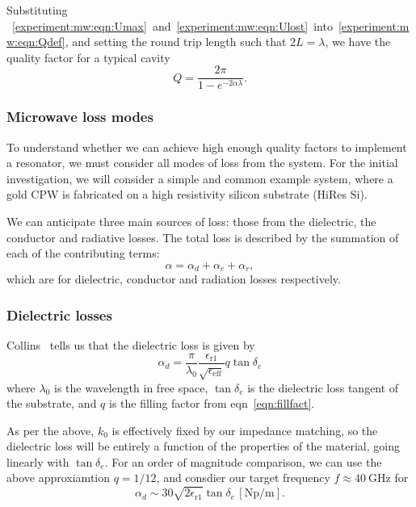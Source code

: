 Substituting
\myeqrefs~\ref{experiment:mw:eqn:Umax}~and~\ref{experiment:mw:eqn:Ulost}~into~\ref{experiment:mw:eqn:Qdef},
and setting the round trip length such that $2L=\lambda$, we have the quality
factor for a typical cavity
\begin{equation}
  Q = \frac{2\pi}{1 - e^{-2 \alpha \lambda}}.
\end{equation}

\subsubsection{Microwave loss modes}

To understand whether we can achieve high enough quality factors to implement a
resonator, we must consider all modes of loss from the system. For the initial
investigation, we will consider a simple and common example system, where a gold
CPW is fabricated on a high resistivity silicon substrate (HiRes Si). 

We can anticipate three main sources of loss: those from the dielectric, the
conductor and radiative losses. \cite{Simons2004} The total loss is described
by the summation of each of the contributing terms:
\begin{equation}
  \alpha = \alpha_d + \alpha_c + \alpha_r,
\end{equation}
which are for dielectric, conductor and radiation losses respectively.

\subsubsection*{Dielectric losses}

Collins~\cite{Collin2007} tells us that the dielectric loss is given by
\begin{equation}
  \alpha_d =
  \frac{\pi}{\lambda_0}\frac{\epsilon_\mathrm{r1}}{\sqrt{\epsilon_\mathrm{eff}}}
  q \tan \delta_e
\end{equation}
where $\lambda_0$ is the wavelength in free space, $\tan \delta_e$ is the
dielectric loss tangent of the substrate, and $q$ is the filling factor from
eqn~\ref{eqn:fillfact}.

As per the above, $k_0$ is effectively fixed by our impedance matching, so the
dielectric loss will be entirely a function of the properties of the material,
going linearly with $\tan\delta_e$. For an order of magnitude comparison, we can
use the above approxiamtion $q=1/12$, and consdier our target frequency
$f\approx\SI{40}{\giga\hertz}$ for
\begin{equation}
  \alpha_d \sim 30\sqrt{2\epsilon_\mathrm{r1}}\tan\delta_e
  \,[\si{\neper\per\meter}].
\end{equation}


